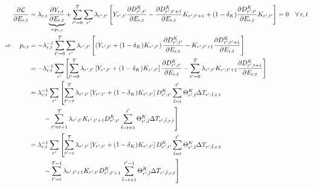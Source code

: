 \documentclass[preprint,3p,authoryear]{elsarticle}
\begin{document}
\begin{align}
  \label{eq:partE}
  \frac{\partial\mcL}{\partial E_{r,t}} &= \lambda_{r,t}\underbrace{\frac{\partial Y_{r,t}}{\partial E_{r,t}}}_{=p_{r,t}}+ \sum_{t'=0}^{\T}\sum_{r'}\lambda_{r',t'}\left[Y_{r',t'}\frac{\partial \DK_{r',t'}}{\partial E_{r,t}}-\pf{\DK_{r',t'+1}}{E_{r,t}}K_{r',t'+1}+(1-\delta_K)\pf{\DK_{r',t'}}{E_{r,t}}K_{r',t'}\right]=0\quad\forall\,r,t\notag\\
  \Rightarrow \quad p_{r,t} &= -\lambda_{r,t}^{-1}\sum_{t'=0}^{\T}\sum_{r'}\lambda_{r',t'}\left[\left(Y_{r',t'}+(1-\delta_K)K_{r',t'}\right)\pf{\DK_{r',t'}}{ E_{r,t}}-K_{r',t'+1}\pf{\DK_{r',t'+1}}{E_{r,t}}\right]\notag\\
                                        &=                                          -\lambda_{r,t}^{-1}\sum_{r'}\left[\sum_{t'=0}^{\T}\lambda_{r',t'}\left[Y_{r',t'}+(1-\delta_K)K_{r',t'}\right]\pf{\DK_{r',t'}}{ E_{r,t}}- \sum_{t'=0}^{\T} \lambda_{r',t'}K_{r',t'+1}\pf{\DK_{r',t+1}}{E_{r,t}}\right]\notag\\
                                        &=                                          \lambda_{r,t}^{-1}\sum_{r'}\left[\sum_{t'=t}^{\T}\lambda_{r',t'}\left[Y_{r',t'}+(1-\delta_K)K_{r',t'}\right]\DK_{r',t'}\sum_{\tilde{t}=t}^{t'}\Theta^{K}_{r',\tilde{t}}\Delta T_{r',\tilde{t},r,t}\right.\\
                                        &\qquad\,\left.-\sum_{t'=t+1}^{\T}\lambda_{r',t'}K_{r',t'+1}\DK_{r',t'}\sum_{\tilde{t}=t+1}^{t'}\Theta^{K}_{r',\tilde{t}}\Delta T_{r',\tilde{t},r,t}\right]\notag\\
  &=
\lambda_{r,t}^{-1}\sum_{r'}\left[\sum_{t'=t}^{\T}\lambda_{r',t'}\left[Y_{r',t'}+(1-\delta_K)K_{r',t'}\right]\DK_{r',t'}\sum_{\tilde{t}=t}^{t'}\Theta^{K}_{r',\tilde{t}}\Delta T_{r',\tilde{t},r,t}\right.\\ &\qquad\,\left.-\sum_{t'=t}^{\T-1}\lambda_{r',t'+1}K_{r',t'}\DK_{r',t'+1}\sum_{\tilde{t}=t+1}^{t'-1}\Theta^{K}_{r',\tilde{t}}\Delta T_{r',\tilde{t},r,t}\right]\notag\\                                         %

\end{align}
\end{document}
